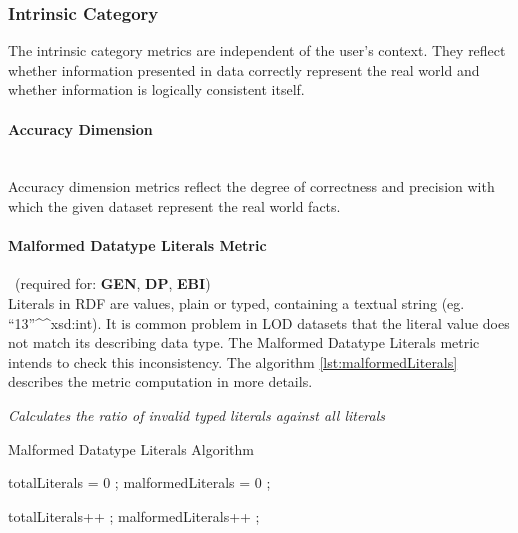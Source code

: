 
\subsubsection{Intrinsic Category}
\label{sec:Intrinsic}
The intrinsic category metrics are independent of the user's context.
They reflect whether information presented in data correctly represent the real world and whether information is logically consistent itself.

\paragraph{Accuracy Dimension}~\\%
Accuracy dimension metrics reflect the degree of correctness and precision with which the given dataset represent the real world facts.

\paragraph{Malformed Datatype Literals Metric}~(required for: \textbf{GEN}, \textbf{DP}, \textbf{EBI})~\\ %
Literals in RDF are values, plain or typed, containing a textual string (eg. ``13''\string^\string^xsd:int).
It is common problem in LOD datasets that the literal value does not match its describing data type. 
The Malformed Datatype Literals metric intends to check this inconsistency.
The algorithm \ref{lst:malformedLiterals} describes the metric computation in more details.

\begin{mdframed}[style=metricdefinition]
\emph{Calculates the ratio of invalid typed literals against all literals}
\end{mdframed}

\begin{algorithm}
\caption{Malformed Datatype Literals Algorithm}\label{lst:malformedLiterals}
\begin{algorithmic}[1]
\State totalLiterals = 0 ;
\State malformedLiterals = 0 ;
\EndProcedure

 totalLiterals++ ;
 malformedLiterals++ ; \EndIf
 \EndIf
\EndProcedure
\end{algorithmic}
\end{algorithm}

